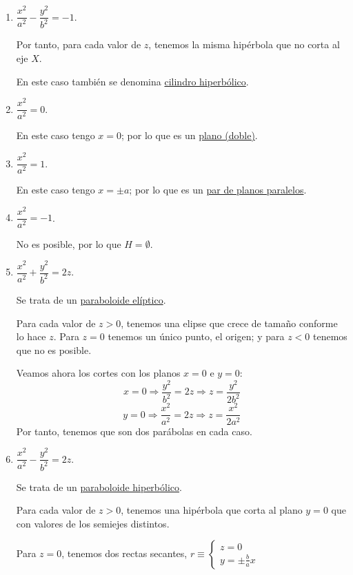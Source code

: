 \begin{enumerate}
    \item $\dfrac{x^2}{a^2} - \dfrac{y^2}{b^2} = -1$.

    Por tanto, para cada valor de $z$, tenemos la misma hipérbola que no corta al eje $X$.

    En este caso también se denomina \ul{cilindro hiperbólico}.
    
    \item $\dfrac{x^2}{a^2} = 0$.

    En este caso tengo $x=0$; por lo que es un \ul{plano (doble)}.
    
    \item $\dfrac{x^2}{a^2} = 1$.

    En este caso tengo $x=\pm a$; por lo que es un \ul{par de planos paralelos}.
    
    \item $\dfrac{x^2}{a^2} = -1$.

    No es posible, por lo que $H=\emptyset$.
    
    \item $\dfrac{x^2}{a^2} + \dfrac{y^2}{b^2} = 2z$.

    Se trata de un \ul{paraboloide elíptico}. 
    
    Para cada valor de $z>0$, tenemos una elipse que crece de tamaño conforme lo hace $z$. Para $z=0$ tenemos un único punto, el origen; y para $z<0$ tenemos que no es posible.

    Veamos ahora los cortes con los planos $x=0$ e $y=0$:
    \begin{equation*}
        x = 0 \Longrightarrow \dfrac{y^2}{b^2} = 2z \Longrightarrow z=\dfrac{y^2}{2b^2}
    \end{equation*}
    \begin{equation*}
        y = 0 \Longrightarrow \dfrac{x^2}{a^2} = 2z \Longrightarrow z=\dfrac{x^2}{2a^2}
    \end{equation*}
    Por tanto, tenemos que son dos parábolas en cada caso.
    
    
    \item $\dfrac{x^2}{a^2} - \dfrac{y^2}{b^2} = 2z$.

    Se trata de un \ul{paraboloide hiperbólico}. 
    
    Para cada valor de $z>0$, tenemos una hipérbola que corta al plano $y=0$ que con valores de los semiejes distintos. 
    
    Para $z=0$, tenemos dos rectas secantes, $r\equiv \left\{\begin{array}{l}
        z=0  \\
        y = \pm \frac{b}{a}x 
    \end{array}\right.$ 
    

\end{enumerate}

